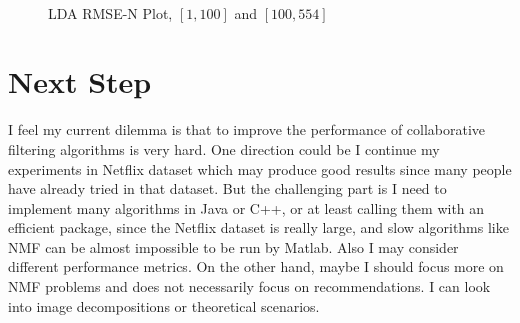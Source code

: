 \documentclass[paper=a4, fontsize=11pt]{scrartcl}
\numberwithin{equation}{section}        %
\numberwithin{figure}{section}          %
\numberwithin{table}{section}               %
\begin{document}
\begin{figure}
\centering
\mbox{
}
\caption{LDA RMSE-N Plot, $[1,100]$ and $[100, 554]$} \label{fig5}
\end{figure}

\section{Next Step}

I feel my current dilemma is that to improve the performance of collaborative filtering algorithms is very hard. One direction could be I continue my experiments in Netflix dataset which may produce good results since many people have already tried in that dataset. But the challenging part is I need to implement many algorithms in Java or C++, or at least calling them with an efficient package, since the Netflix dataset is really large, and slow algorithms like NMF can be almost impossible to be run by Matlab. Also I may consider different performance metrics. On the other hand, maybe I should focus more on NMF problems and does not necessarily focus on recommendations. I can look into image decompositions or theoretical scenarios.
\end{document}
